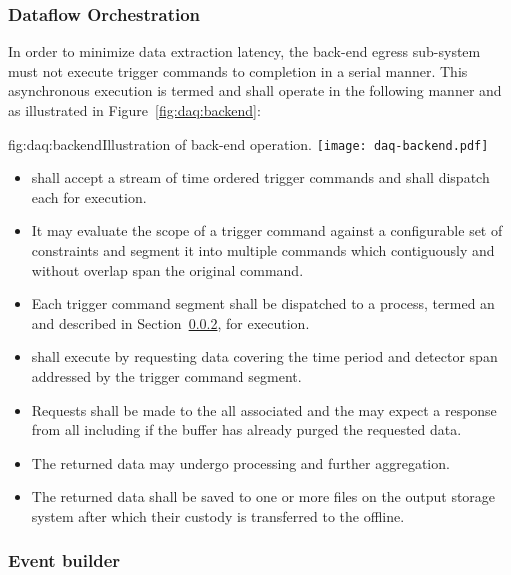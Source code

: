 \subsubsection{Dataflow Orchestration}

In order to minimize data extraction latency, the back-end egress sub-system must not execute trigger commands to completion in a serial manner. 
This asynchronous execution is termed  and shall operate in the following manner and as illustrated in Figure~\ref{fig:daq:backend}:

\begin{dunefigure}{fig:daq:backend}{Illustration of   back-end operation.}
  \texttt{[image: daq-backend.pdf]}
\end{dunefigure}

\begin{itemize}
\item {} shall accept a stream of time ordered trigger commands and shall dispatch each for execution.
\item It may evaluate the scope of a trigger command against a configurable set of constraints and segment it into multiple commands which contiguously and without overlap span the original command.
\item Each trigger command segment shall be dispatched to a process, termed an  and described in Section~\ref{sec:fd-daq:design-event-builder}, for execution.
\item {} shall execute by requesting data covering the time period and detector span addressed by the trigger command segment.
\item Requests shall be made to the all associated  and the  may expect a response from all including if the buffer has already purged the requested data.
\item The returned data may undergo processing and further aggregation.
\item The returned data shall be saved to one or more files on the output storage system after which their custody is transferred to the offline.
\end{itemize}



\subsubsection{Event builder}
\label{sec:fd-daq:design-event-builder}

